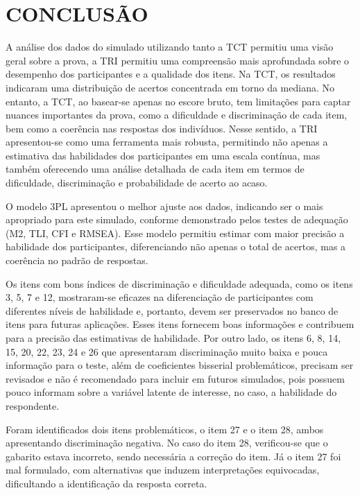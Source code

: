 \chapter{CONCLUSÃO}
	

A análise dos dados do simulado utilizando tanto a TCT permitiu uma visão geral sobre a prova, a TRI permitiu uma compreensão mais aprofundada sobre o desempenho dos participantes e a qualidade dos itens. Na TCT, os resultados indicaram uma distribuição de acertos concentrada em torno da mediana. No entanto, a TCT, ao basear-se apenas no escore bruto, tem limitações para captar nuances importantes da prova, como a dificuldade e discriminação de cada item, bem como a coerência nas respostas dos indivíduos. Nesse sentido, a TRI apresentou-se como uma ferramenta mais robusta, permitindo não apenas a estimativa das habilidades dos participantes em uma escala contínua, mas também oferecendo uma análise detalhada de cada item em termos de dificuldade, discriminação e probabilidade de acerto ao acaso.

O modelo 3PL apresentou o melhor ajuste aos dados, indicando ser o mais apropriado para este simulado, conforme demonstrado pelos testes de adequação (M2, TLI, CFI e RMSEA). Esse modelo permitiu estimar com maior precisão a habilidade dos participantes, diferenciando não apenas o total de acertos, mas a coerência no padrão de respostas.

Os itens com bons índices de discriminação e dificuldade adequada, como os itens 3, 5, 7 e 12, mostraram-se eficazes na diferenciação de participantes com diferentes níveis de habilidade e, portanto, devem ser preservados no banco de itens para futuras aplicações. Esses itens fornecem boas informações e contribuem para a precisão das estimativas de habilidade. Por outro lado, os itens 6, 8, 14, 15, 20, 22, 23, 24 e 26 que apresentaram discriminação muito baixa e pouca informação para o teste, além de coeficientes bisserial problemáticos, precisam ser revisados e não é recomendado para incluir em futuros simulados, pois possuem pouco informam sobre a variável latente de interesse, no caso, a habilidade do respondente.

Foram identificados dois itens problemáticos, o item 27 e o item 28, ambos apresentando discriminação negativa. No caso do item 28, verificou-se que o gabarito estava incorreto, sendo necessária a correção do item. Já o item 27 foi mal formulado, com alternativas  que induzem interpretações equivocadas, dificultando a identificação da resposta correta.

